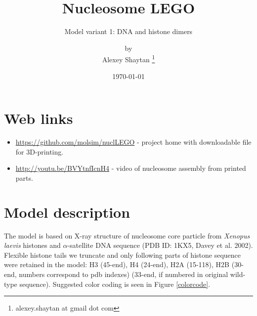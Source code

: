 \documentclass[12pt,onecolumn]{scrartcl}
\title{Nucleosome LEGO} %
\subtitle{ Model variant 1: DNA and histone dimers }
\author{by \\ Alexey Shaytan \footnote{alexey.shaytan at gmail dot com}} %
\date{\small{\today}} %
\begin{document}
\maketitle %



\section{Web links}
\begin{itemize}  

        \item \url{https://github.com/molsim/nuclLEGO} - project home with downloadable file for 3D-printing.
        \item \url{http://youtu.be/BVYtnfIcnH4} - video of nucleosome assembly from printed parts.
\end{itemize}




\section{Model description}
The model is based on X-ray structure of nucleosome core particle from \textit{Xenopus laevis} histones and $\alpha$-satellite DNA sequence (PDB ID: 1KX5, Davey et al. 2002). Flexible histone tails we truncate and only following parts of histone sequence were retained in the model: H3 (45-end), H4 (24-end), H2A (15-118), H2B (30-end, numbers correspond to pdb indexes) (33-end, if numbered in original wild-type sequence). Suggested color coding is seen in Figure \ref{colorcode}.
\end{document}
